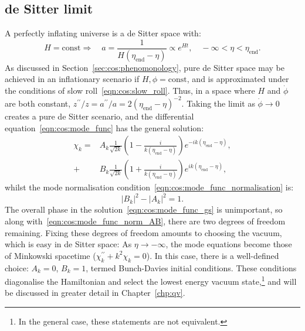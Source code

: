 \subsection{de Sitter limit}
A perfectly inflating universe is a de Sitter space with:
\begin{equation}
  H=\text{const}\Rightarrow \quad a = \frac{1}{H(\eta_\mathrm{end}-\eta)} \propto e^{Ht}, \quad -\infty<\eta<\eta_\mathrm{end}.
  \label{eqn:cos:de_sitter}
\end{equation}
As discussed in Section~\ref{sec:cos:phenomonology}, pure de Sitter space may be achieved in an inflationary scenario if \(H,\phi=\mathrm{const}\), and is approximated under the conditions of slow roll~\eqref{eqn:cos:slow_roll}. 
Thus, in a space where \(H\) and \(\dot\phi\) are both constant, \({z^{\prime\prime}/z = a^{\prime\prime}/a = 2{(\eta_\mathrm{end}-\eta)}^{-2}}\). Taking the limit as \(\dot{\phi}\to0\) creates a pure de Sitter scenario, and the differential equation~\eqref{eqn:cos:mode_func} has the general solution:
\begin{align}
  \chi_k = &A_k \frac{1}{\sqrt{2k}}\left( 1-\frac{i}{k(\eta_\mathrm{end}-\eta)} \right)e^{-ik(\eta_\mathrm{end}-\eta)}, \nonumber\\
  + &B_k \frac{1}{\sqrt{2k}}\left( 1+\frac{i}{k(\eta_\mathrm{end}-\eta)} \right)e^{ik(\eta_\mathrm{end}-\eta)},
  \label{eqn:cos:mode_func_gs}
\end{align}
whilst the mode normalisation condition~\eqref{eqn:cos:mode_func_normalisation} is:
\begin{equation}
  |B_k|^2 - |A_k|^2 = 1.
  \label{eqn:cos:mode_func_norm_AB}
\end{equation}
The overall phase in the solution~\eqref{eqn:cos:mode_func_gs} is unimportant, so along with~\eqref{eqn:cos:mode_func_norm_AB}, there are two degrees of freedom remaining. Fixing these degrees of freedom amounts to choosing the vacuum, which is easy in de Sitter space: As \(\eta\rightarrow -\infty\), the mode equations become those of Minkowski spacetime (\(\chi_k^{\prime\prime} +k^2 \chi_k=0\)). In this case, there is a well-defined choice: \(A_k=0\), \(B_k=1\), termed Bunch-Davies initial conditions. These conditions diagonalise the Hamiltonian and select the lowest energy vacuum state,\footnote{In the general case, these statements are not equivalent.} and will be discussed in greater detail in Chapter~\ref{chp:qv}.

